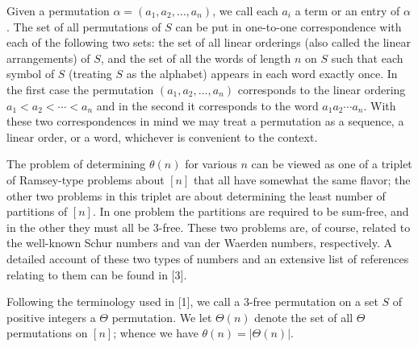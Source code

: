 \documentclass[10pt]{article}
\begin{document}
Given a permutation $\alpha=\left(a_{1}, a_{2}, \ldots, a_{n}\right)$, we call each $a_{i}$ a term or an entry of $\alpha$. The set of all permutations of $S$ can be put in one-to-one correspondence with each of the following two sets: the set of all linear orderings (also called the linear arrangements) of $S$, and the set of all the words of length $n$ on $S$ such that each symbol of $S$ (treating $S$ as the alphabet) appears in each word exactly once. In the first case the permutation $\left(a_{1}, a_{2}, \ldots, a_{n}\right)$ corresponds to the linear ordering $a_{1}<a_{2}<\cdots<a_{n}$ and in the second it corresponds to the word $a_{1} a_{2} \cdots a_{n}$. With these two correspondences in mind we may treat a permutation as a sequence, a linear order, or a word, whichever is convenient to the context.

The problem of determining $\theta(n)$ for various $n$ can be viewed as one of a triplet of Ramsey-type problems about $[n]$ that all have somewhat the same flavor; the other two problems in this triplet are about determining the least number of partitions of $[n]$. In one problem the partitions are required to be sum-free, and in the other they must all be 3-free. These two problems are, of course, related to the well-known Schur numbers and van der Waerden numbers, respectively. A detailed account of these two types of numbers and an extensive list of references relating to them can be found in [3].

Following the terminology used in [1], we call a 3-free permutation on a set $S$ of positive integers a $\Theta$ permutation. We let $\Theta(n)$ denote the set of all $\Theta$ permutations on $[n]$; whence we have $\theta(n)=|\Theta(n)|$.
\end{document}
